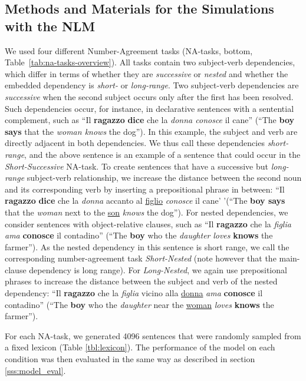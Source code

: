 \subsection{Methods and Materials for the Simulations with the NLM}
We used four different Number-Agreement tasks (NA-tasks, bottom, Table~\ref{tab:na-tasks-overview}). All tasks contain two subject-verb dependencies, which differ in terms of whether they are \emph{successive} or \emph{nested} and whether the embedded dependency is \emph{short-} or \emph{long-range}. Two subject-verb dependencies are \emph{successive} when the second subject occurs only after the first has been resolved. 
Such dependencies occur, for instance, in declarative sentences with a sentential complement, such as ``Il \textbf{ragazzo} \textbf{dice} che la \textit{donna conosce} il cane'' (``The \textbf{boy says} that the \emph{woman knows} the dog'').
In this example, the subject and verb are directly adjacent in both dependencies.
We thus call these dependencies \emph{short-range}, and the above sentence is an example of a sentence that could occur in the \emph{Short-Successive} NA-task. 
To create sentences that have a successive but \emph{long-range} subject-verb relationship, we increase the distance between the second noun and its corresponding verb by inserting a prepositional phrase in between: ``Il \textbf{ragazzo} \textbf{dice} che la \textit{donna} accanto al \underline{figlio} \textit{conosce} il cane' '(``The \textbf{boy says} that the \emph{woman} next to the \underline{son} \emph{knows} the dog''). For nested dependencies, we consider sentences with object-relative clauses, such as ``Il \textbf{ragazzo} che la \emph{figlia} \emph{ama} \textbf{conosce} il contadino'' (``The \textbf{boy} who the \emph{daughter} \emph{loves} \textbf{knows} the farmer'').
As the nested dependency in this sentence is short range, we call the corresponding number-agreement task \emph{Short-Nested} (note however that the main-clause dependency is long range). For \emph{Long-Nested}, we again use prepositional phrases to increase the distance between the subject and verb of the nested dependency: ``Il \textbf{ragazzo} che la \emph{figlia} vicino alla \underline{donna} \emph{ama} \textbf{conosce} il contadino'' (``The \textbf{boy} who the \emph{daughter} near the \underline{woman} \emph{loves} \textbf{knows} the farmer'').

For each NA-task, we generated 4096 sentences that were randomly sampled from a fixed lexicon (Table \ref{tbl:lexicon}). The performance of the model on each condition was then evaluated in the same way as described in section \ref{sss:model_eval}.


